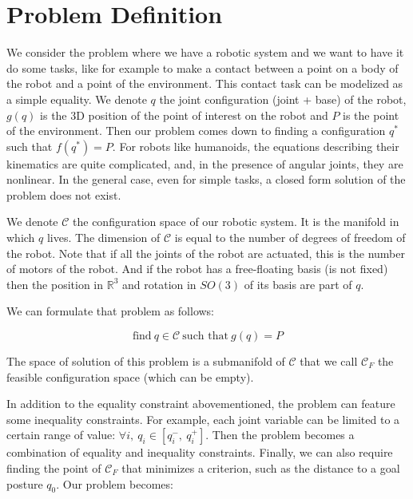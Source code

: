 \section{Problem Definition}
\label{sec:problem_definition}


We consider the problem where we have a robotic system and we want to have it do some tasks, like for example to make a contact between a point on a body of the robot and a point of the environment.
This contact task can be modelized as a simple equality.
We denote $q$ the joint configuration (joint + base) of the robot, $g(q)$ is the 3D position of the point of interest on the robot and $P$ is the point of the environment.
Then our problem comes down to finding a configuration $q^*$ such that $f(q^*) = P$.
For robots like humanoids, the equations describing their kinematics are quite complicated, and, in the presence of angular joints, they are nonlinear.
In the general case, even for simple tasks, a closed form solution of the problem does not exist.

We denote $\mathcal{C}$ the configuration space of our robotic system.
It is the manifold in which $q$ lives. The dimension of $\mathcal{C}$ is equal to the number of degrees of freedom of the robot.
Note that if all the joints of the robot are actuated, this is the number of motors of the robot.
And if the robot has a free-floating basis (is not fixed) then the position in $\mathbb{R}^3$ and rotation in $SO(3)$ of its basis are part of $q$.

We can formulate that problem as follows:

\begin{equation}
  \text{find}\ q\in\mathcal{C}\ \text{such that}\ g(q)=P
\end{equation}

The space of solution of this problem is a submanifold of $\mathcal{C}$ that we call ${\mathcal{C}}_F$ the feasible configuration space (which can be empty).

In addition to the equality constraint abovementioned, the problem can feature some inequality constraints.
For example, each joint variable can be limited to a certain range of value: $\forall i,\ q_i\in [q_i^-,\ q_i^+]$. Then the problem becomes a combination of equality and inequality constraints.%
Finally, we can also require finding the point of $\mathcal{C}_F$ that minimizes a criterion, such as the distance to a goal posture $q_0$.
Our problem becomes:

